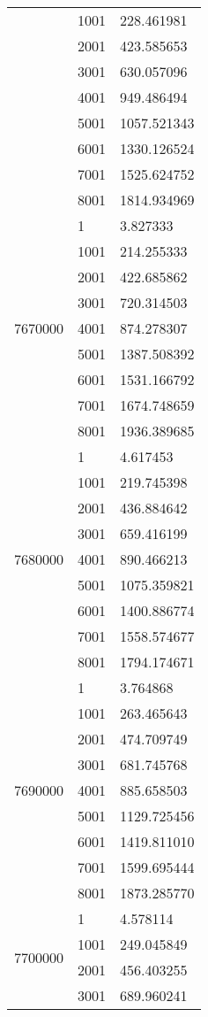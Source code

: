 \begin{table}[htb!]
\begin{tabular}{lll}
 & 1001 & 228.461981 \\
 & 2001 & 423.585653 \\
 & 3001 & 630.057096 \\
 & 4001 & 949.486494 \\
 & 5001 & 1057.521343 \\
 & 6001 & 1330.126524 \\
 & 7001 & 1525.624752 \\
 & 8001 & 1814.934969 \\
\multirow[c]{9}{*}{7670000} & 1 & 3.827333 \\
 & 1001 & 214.255333 \\
 & 2001 & 422.685862 \\
 & 3001 & 720.314503 \\
 & 4001 & 874.278307 \\
 & 5001 & 1387.508392 \\
 & 6001 & 1531.166792 \\
 & 7001 & 1674.748659 \\
 & 8001 & 1936.389685 \\
\multirow[c]{9}{*}{7680000} & 1 & 4.617453 \\
 & 1001 & 219.745398 \\
 & 2001 & 436.884642 \\
 & 3001 & 659.416199 \\
 & 4001 & 890.466213 \\
 & 5001 & 1075.359821 \\
 & 6001 & 1400.886774 \\
 & 7001 & 1558.574677 \\
 & 8001 & 1794.174671 \\
\multirow[c]{9}{*}{7690000} & 1 & 3.764868 \\
 & 1001 & 263.465643 \\
 & 2001 & 474.709749 \\
 & 3001 & 681.745768 \\
 & 4001 & 885.658503 \\
 & 5001 & 1129.725456 \\
 & 6001 & 1419.811010 \\
 & 7001 & 1599.695444 \\
 & 8001 & 1873.285770 \\
\multirow[c]{9}{*}{7700000} & 1 & 4.578114 \\
 & 1001 & 249.045849 \\
 & 2001 & 456.403255 \\
 & 3001 & 689.960241 \\

\end{tabular}
\end{table}
